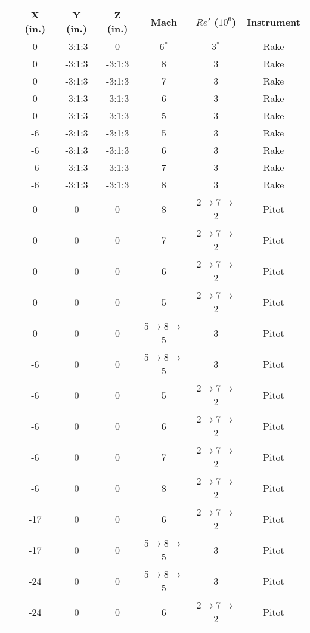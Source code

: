 \setcounter{rownum}{0}
\begin{table}[ht!]
    \centering
    \begin{tabular}{|>{\stepcounter{rownum}\therownum}c|c|c|c|c|c|c|}
        \hline
        \multicolumn{1}{|c|}{\textbf{Run}} & \textbf{X (in.)} & \textbf{Y (in.)} & \textbf{Z (in.)} & \textbf{Mach} & \textbf{$Re'$ ($10^6$)} & \textbf{ Instrument} \\ \hline
        & 0 & -3:1:3 & 0 & 6$^*$ & 3$^*$ & Rake\\ \hline
        & 0 & -3:1:3 & -3:1:3 & 8 & 3 & Rake\\ \hline
        & 0 & -3:1:3 & -3:1:3 & 7 & 3 & Rake\\ \hline
        & 0 & -3:1:3 & -3:1:3 & 6 & 3 & Rake\\ \hline
        & 0 & -3:1:3 & -3:1:3 & 5 & 3 & Rake\\ \hline
        & -6 & -3:1:3 & -3:1:3 & 5 & 3 & Rake\\ \hline
        & -6 & -3:1:3 & -3:1:3 & 6 & 3 & Rake\\ \hline
        & -6 & -3:1:3 & -3:1:3 & 7 & 3 & Rake\\ \hline
        & -6 & -3:1:3 & -3:1:3 & 8 & 3 & Rake\\ \hline
        & 0 & 0 & 0 & 8 & 2$\to$7$\to$2 & Pitot\\ \hline
        & 0 & 0 & 0 & 7 & 2$\to$7$\to$2 & Pitot\\ \hline
        & 0 & 0 & 0 & 6 & 2$\to$7$\to$2 & Pitot\\ \hline
        & 0 & 0 & 0 & 5 & 2$\to$7$\to$2 & Pitot\\ \hline
        & 0 & 0 & 0 & 5$\to$8$\to$5 & 3 & Pitot\\ \hline
        & -6 & 0 & 0 & 5$\to$8$\to$5 & 3 & Pitot\\ \hline
        & -6 & 0 & 0 & 5 & 2$\to$7$\to$2 & Pitot\\ \hline
        & -6 & 0 & 0 & 6 & 2$\to$7$\to$2 & Pitot\\ \hline
        & -6 & 0 & 0 & 7 & 2$\to$7$\to$2 & Pitot\\ \hline
        & -6 & 0 & 0 & 8 & 2$\to$7$\to$2 & Pitot\\ \hline
        & -17 & 0 & 0 & 6 & 2$\to$7$\to$2 & Pitot\\ \hline
        & -17 & 0 & 0 & 5$\to$8$\to$5 & 3 & Pitot\\ \hline
        & -24 & 0 & 0 & 5$\to$8$\to$5 & 3 & Pitot\\ \hline
        & -24 & 0 & 0 & 6 & 2$\to$7$\to$2 & Pitot\\ \hline

\end{tabular}
\end{table}

